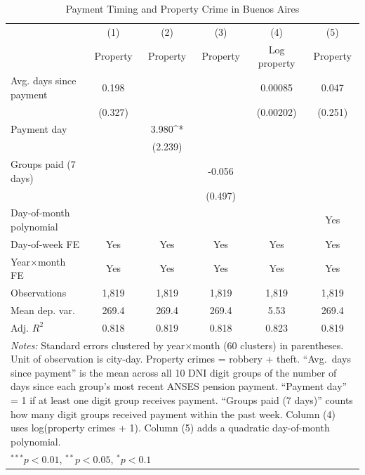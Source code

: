 \begin{table}[t]
\centering
\caption{Payment Timing and Property Crime in Buenos Aires}
\label{tab:main}
\begin{tabular}{lccccc}
\hline\hline
 & (1) & (2) & (3) & (4) & (5) \\
 & Property & Property & Property & Log property & Property \\
\hline
Avg. days since payment & 0.198 & & & 0.00085 & 0.047 \\
 & (0.327) & & & (0.00202) & (0.251) \\
Payment day & & 3.980^{*} & & & \\
 & & (2.239) & & & \\
Groups paid (7 days) & & & -0.056 & & \\
 & & & (0.497) & & \\
Day-of-month polynomial & & & & & Yes \\
Day-of-week FE & Yes & Yes & Yes & Yes & Yes \\
Year$\times$month FE & Yes & Yes & Yes & Yes & Yes \\
Observations & 1,819 & 1,819 & 1,819 & 1,819 & 1,819 \\
Mean dep. var. & 269.4 & 269.4 & 269.4 & 5.53 & 269.4 \\
Adj. $R^2$ & 0.818 & 0.819 & 0.818 & 0.823 & 0.819 \\
\hline
\multicolumn{6}{p{0.95\textwidth}}{\footnotesize \textit{Notes:} Standard errors clustered by year$\times$month (60 clusters) in parentheses. Unit of observation is city-day. Property crimes = robbery + theft. ``Avg.\ days since payment'' is the mean across all 10 DNI digit groups of the number of days since each group's most recent ANSES pension payment. ``Payment day'' = 1 if at least one digit group receives payment. ``Groups paid (7 days)'' counts how many digit groups received payment within the past week. Column (4) uses log(property crimes + 1). Column (5) adds a quadratic day-of-month polynomial.} \\
\multicolumn{6}{l}{\footnotesize $^{***}p<0.01$, $^{**}p<0.05$, $^{*}p<0.1$} \\
\end{tabular}
\end{table}
